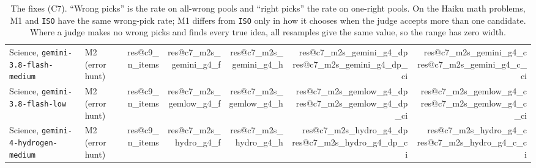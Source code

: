 \documentclass[10pt,twocolumn]{article}
\makeatletter
\newcommand{\res}[1]{\csname res@#1\endcsname}
\makeatother
\begin{document}
\begin{table}[t]
{\begin{tabular}{llrrrrr}
Science, \texttt{gemini-3.8-flash-medium} & M2 (error hunt) & \res{c9_n_items} & \res{c7_m2s_gemini_g4_f} & \res{c7_m2s_gemini_g4_h} & \res{c7_m2s_gemini_g4_dp} \res{c7_m2s_gemini_g4_dp_ci} & \res{c7_m2s_gemini_g4_c} \res{c7_m2s_gemini_g4_c_ci} \\
Science, \texttt{gemini-3.8-flash-low} & M2 (error hunt) & \res{c9_n_items} & \res{c7_m2s_gemlow_g4_f} & \res{c7_m2s_gemlow_g4_h} & \res{c7_m2s_gemlow_g4_dp} \res{c7_m2s_gemlow_g4_dp_ci} & \res{c7_m2s_gemlow_g4_c} \res{c7_m2s_gemlow_g4_c_ci} \\
Science, \texttt{gemini-4-hydrogen-medium} & M2 (error hunt) & \res{c9_n_items} & \res{c7_m2s_hydro_g4_f} & \res{c7_m2s_hydro_g4_h} & \res{c7_m2s_hydro_g4_dp} \res{c7_m2s_hydro_g4_dp_ci} & \res{c7_m2s_hydro_g4_c} \res{c7_m2s_hydro_g4_c_ci} \\
\bottomrule
\end{tabular}%
}
\caption{The fixes (C7). ``Wrong picks'' is the rate on all-wrong pools and ``right picks'' the rate on one-right pools. On the Haiku math problems, M1 and \texttt{ISO} have the same wrong-pick rate; M1 differs from \texttt{ISO} only in how it chooses when the judge accepts more than one candidate. Where a judge makes no wrong picks and finds every true idea, all resamples give the same value, so the range has zero width.}
\label{tab:mitigation}
\end{table}
\end{document}
